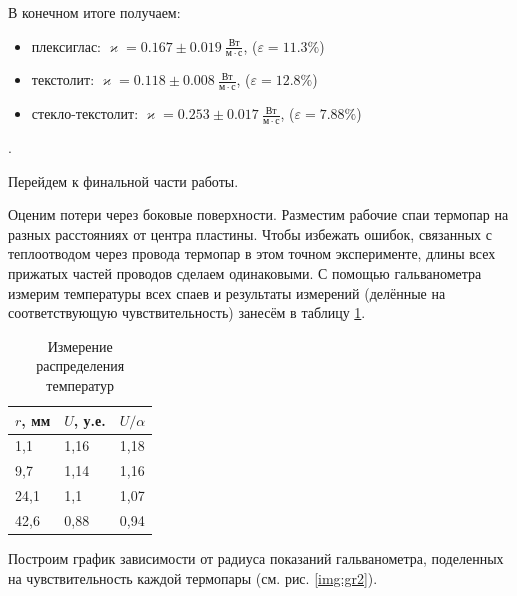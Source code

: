 \documentclass[a4paper, 12pt]{article}
\newcounter{Points}
\newcommand{\point}{\arabic{Points}. \addtocounter{Points}{1}}
\begin{document}
В конечном итоге получаем:

\begin{itemize}
    \item плексиглас: $ \varkappa = 0.167 \pm 0.019~\frac{Вт}{м \cdot с} $, ($\varepsilon = 11.3\%$)
    
    \item текстолит: $ \varkappa = 0.118 \pm 0.008~\frac{Вт}{м \cdot с} $, ($\varepsilon = 12.8\%$)
    
    \item стекло-текстолит: $ \varkappa = 0.253 \pm 0.017~\frac{Вт}{м \cdot с} $, ($\varepsilon = 7.88\%$)
\end{itemize}

\point Перейдем к финальной части работы.

Оценим потери через боковые поверхности. Разместим рабочие спаи термопар на разных расстояниях от центра пластины. Чтобы избежать ошибок, связанных с теплоотводом через провода термопар в этом точном эксперименте, длины всех прижатых частей проводов сделаем одинаковыми. С помощью гальванометра измерим температуры всех спаев и результаты измерений (делённые на соответствующую чувствительность) занесём в таблицу \ref{tab:losses}.

\begin{table}[H]
	\centering
	\begin{tabular}{|l|l|l|}
		\hline
		$ r $, мм & $ U $, у.е. & $ U/\alpha $  \\ \hline
		1,1   & 1,16    & 1,18 \\ \hline
		9,7   & 1,14    & 1,16 \\ \hline
		24,1  & 1,1     & 1,07 \\ \hline
		42,6  & 0,88    & 0,94 \\ \hline
	\end{tabular}
	\caption{Измерение распределения температур}
	\label{tab:losses}
\end{table}

Построим график зависимости от радиуса показаний гальванометра, поделенных на чувствительность каждой термопары (см. рис. \ref{img:gr2}). 
\end{document}

